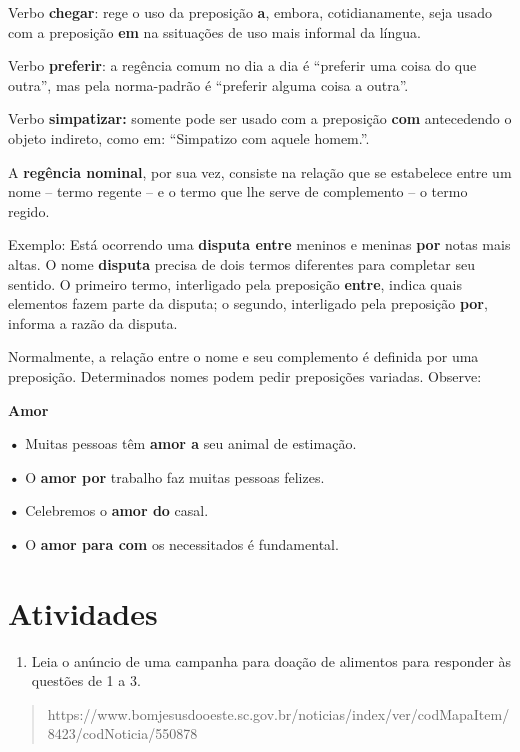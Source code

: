 \begin{itemize}
\begin{itemize}
{Verbo \textbf{chegar}: rege o uso da preposição \textbf{a}, embora,
cotidianamente, seja usado com a preposição \textbf{em} na ssituações de
uso mais informal da língua.

Verbo \textbf{preferir}: a regência comum no dia a dia é ``preferir uma
coisa do que outra'', mas pela norma-padrão é ``preferir alguma coisa a
outra''.

Verbo \textbf{simpatizar:} somente pode ser usado com a preposição
\textbf{com} antecedendo o objeto indireto, como em: ``Simpatizo com
aquele homem.''.

A \textbf{regência nominal}, por sua vez, consiste na relação que se
estabelece entre um nome -- termo regente -- e o termo que lhe serve de
complemento -- o termo regido.

Exemplo: Está ocorrendo uma \textbf{disputa entre} meninos e meninas
\textbf{por} notas mais altas. O nome \textbf{disputa} precisa de dois
termos diferentes para completar seu sentido. O primeiro termo,
interligado pela preposição \textbf{entre}, indica quais elementos fazem
parte da disputa; o segundo, interligado pela preposição \textbf{por},
informa a razão da disputa.

Normalmente, a relação entre o nome e seu complemento é definida por uma
preposição. Determinados nomes podem pedir preposições variadas.
Observe:

\textbf{Amor}

\textbf{•} Muitas pessoas têm \textbf{amor a} seu animal de estimação.

\textbf{•} O \textbf{amor por} trabalho faz muitas pessoas felizes.

\textbf{•} Celebremos o \textbf{amor do} casal.

\textbf{•} O \textbf{amor para com} os necessitados é fundamental.
}

\section{Atividades}

\begin{enumerate}
\def\labelenumi{\arabic{enumi}.}
\tightlist
\item
  Leia o anúncio de uma campanha para doação de alimentos para responder
  às questões de 1 a 3.
\end{enumerate}

\begin{quote}
https://www.bomjesusdooeste.sc.gov.br/noticias/index/ver/codMapaItem/8423/codNoticia/550878


\end{quote}
\end{itemize}
\end{itemize}
